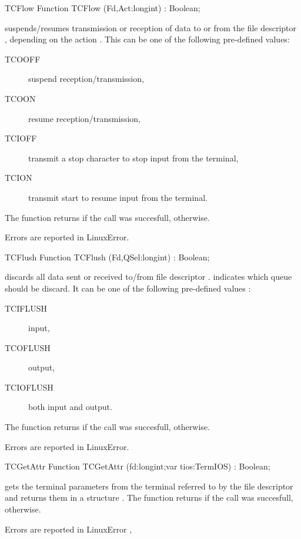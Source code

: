 \begin{function}{TCFlow}
\Declaration
Function TCFlow (Fd,Act:longint) : Boolean;

\Description
  suspends/resumes transmission or reception of data to or from the file
descriptor , depending
  on the action . This can be one of the following pre-defined
values: 
\begin{description}
\item [TCOOFF\ ] suspend reception/transmission,
\item [TCOON\ ] resume  reception/transmission,
\item [TCIOFF\ ] transmit a stop character to stop input from the terminal, 
\item [TCION\ ] transmit start to resume input from the terminal.
\end{description}
The function returns  if the call was succesfull, 
otherwise.

\Errors
Errors are reported in LinuxError.
\SeeAlso
{}
\end{function}
\begin{function}{TCFlush}
\Declaration
Function TCFlush (Fd,QSel:longint) : Boolean;

\Description
  discards all data sent or received to/from file descriptor . 
  indicates which queue
  should be discard. It can be one of the following pre-defined values :
\begin{description}
\item [TCIFLUSH\ ] input,
\item [TCOFLUSH\ ] output,
\item [TCIOFLUSH\ ] both input and output.
\end{description}
The function returns  if the call was succesfull, 
otherwise.

\Errors
Errors are reported in LinuxError.
\SeeAlso
{}
\end{function}
\begin{function}{TCGetAttr}
\Declaration
Function TCGetAttr (fd:longint;var tios:TermIOS) : Boolean;

\Description
  gets the terminal parameters from the terminal referred to by the file
  descriptor  and returns them in a  structure . 
The function returns  if the call was succesfull, 
otherwise.

\Errors
Errors are reported in LinuxError
\SeeAlso
{},  
\end{function}
